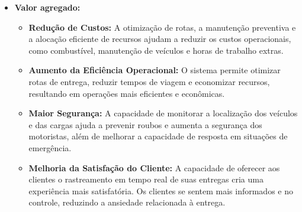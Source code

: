 \begin{itemize}
	\item \textbf{Valor agregado:} 
	\begin{itemize}
		\item \textbf{Redução de Custos:} A otimização de rotas, a manutenção preventiva e a alocação eficiente de recursos ajudam a reduzir os custos operacionais, como combustível, manutenção de veículos e horas de trabalho extras.
		
		\item \textbf{Aumento da Eficiência Operacional:} O sistema permite otimizar rotas de entrega, reduzir tempos de viagem e economizar recursos, resultando em operações mais eficientes e econômicas.
		
		\item \textbf{Maior Segurança:} A capacidade de monitorar a localização dos veículos e das cargas ajuda a prevenir roubos e aumenta a segurança dos motoristas, além de melhorar a capacidade de resposta em situações de emergência.
		
		\item \textbf{Melhoria da Satisfação do Cliente:} A capacidade de oferecer aos clientes o rastreamento em tempo real de suas entregas cria uma experiência mais satisfatória. Os clientes se sentem mais informados e no controle, reduzindo a ansiedade relacionada à entrega.
	\end{itemize}
\end{itemize}

